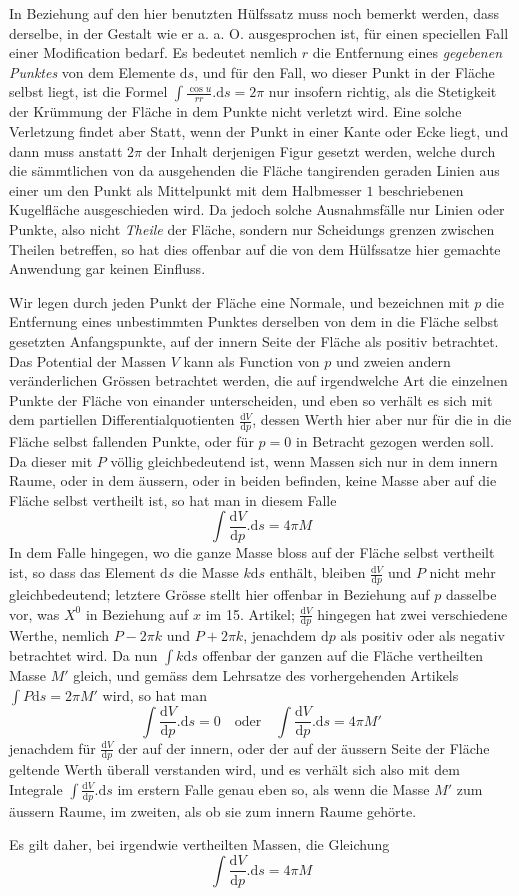 In Beziehung auf den hier benutzten Hülfssatz muss noch bemerkt werden, dass derselbe, in der Gestalt wie er a. a. O. ausgesprochen ist, für einen speciellen Fall einer Modification bedarf. Es bedeutet nemlich $r$ die Entfernung eines \textit{gegebenen Punktes} von dem Elemente $\mathrm ds$, und für den Fall, wo dieser Punkt in der Fläche selbst liegt, ist die Formel $\int\frac{\cos u}{rr}.\mathrm ds=2\pi$ nur insofern richtig, als die Stetigkeit der Krümmung der Fläche in dem Punkte nicht verletzt wird. Eine solche Verletzung findet aber Statt, wenn der Punkt in einer Kante oder Ecke liegt, und dann muss anstatt $2\pi$ der Inhalt derjenigen Figur gesetzt werden, welche durch die sämmtlichen von da ausgehenden die Fläche tangirenden geraden Linien aus einer um den Punkt als Mittelpunkt mit dem Halbmesser $1$ beschriebenen Kugelfläche ausgeschieden wird. Da jedoch solche Ausnahmsfälle nur Linien oder Punkte, also nicht \textit{Theile} der Fläche, sondern nur Scheidungs%
%
grenzen zwischen Theilen betreffen, so hat dies offenbar auf die von dem Hülfssatze hier gemachte Anwendung gar keinen Einfluss.

Wir legen durch jeden Punkt der Fläche eine Normale, und bezeichnen mit $p$ die Entfernung eines unbestimmten Punktes derselben von dem in die Fläche selbst gesetzten Anfangspunkte, auf der innern Seite der Fläche als positiv betrachtet. Das Potential der Massen $V$ kann als Function von $p$ und zweien andern veränderlichen Grössen betrachtet werden, die auf irgendwelche Art die einzelnen Punkte der Fläche von einander unterscheiden, und eben so verhält es sich mit dem partiellen Differentialquotienten $\frac{\mathrm dV}{\mathrm dp}$, dessen Werth hier aber nur für die in die Fläche selbst fallenden Punkte, oder für $p=0$ in Betracht gezogen werden soll. Da dieser mit $P$ völlig gleichbedeutend ist, wenn Massen sich nur in dem innern Raume, oder in dem äussern, oder in beiden befinden, keine Masse aber auf die Fläche selbst vertheilt ist, so hat man in diesem Falle
\[
\int\frac{\mathrm dV}{\mathrm dp}.\mathrm ds=4\pi M
\]
In dem Falle hingegen, wo die ganze Masse bloss auf der Fläche selbst vertheilt ist, so dass das Element $\mathrm ds$ die Masse $k\mathrm ds$ enthält, bleiben $\frac{\mathrm dV}{\mathrm dp}$ und $P$ nicht mehr gleichbedeutend; letztere Grösse stellt hier offenbar in Beziehung auf $p$ dasselbe vor, was $X^0$ in Beziehung auf $x$ im 15. Artikel; $\frac{\mathrm dV}{\mathrm dp}$ hingegen hat zwei verschiedene Werthe, nemlich $P-2\pi k$ und $P+2\pi k$, jenachdem $\mathrm dp$ als positiv oder als negativ betrachtet wird. Da nun $\int k\mathrm ds$ offenbar der ganzen auf die Fläche vertheilten Masse $M'$ gleich, und gemäss dem Lehrsatze des vorhergehenden Artikels $\int P\mathrm ds=2\pi M'$ wird, so hat man
\[
\int\frac{\mathrm dV}{\mathrm dp}.\mathrm ds=0\quad\text{oder}\quad\int\frac{\mathrm dV}{\mathrm dp}.\mathrm ds=4\pi M'
\]
jenachdem für $\frac{\mathrm dV}{\mathrm dp}$ der auf der innern, oder der auf der äussern Seite der Fläche geltende Werth überall verstanden wird, und es verhält sich also mit dem Integrale $\int\frac{\mathrm dV}{\mathrm dp}.\mathrm ds$ im erstern Falle genau eben so, als wenn die Masse $M'$ zum äussern Raume, im zweiten, als ob sie zum innern Raume gehörte.

Es gilt daher, bei irgendwie vertheilten Massen, die Gleichung
\[
\int\frac{\mathrm dV}{\mathrm dp}.\mathrm ds=4\pi M
\]
